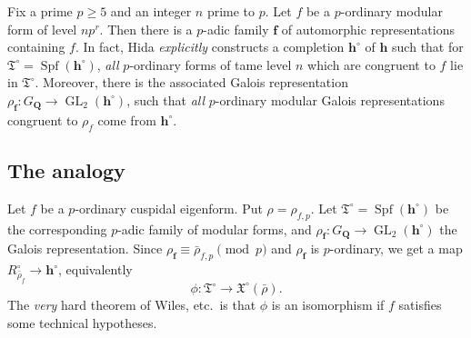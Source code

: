 \documentclass[oneside]{amsart}
\DeclareMathOperator{\formalspectrum}{Spf}
\DeclareMathOperator{\GL}{GL}
\newcommand{\dQ}{\mathbf{Q}}
\newcommand{\fT}{\mathfrak{T}}
\newcommand{\fX}{\mathfrak{X}}
\newcommand{\hida}{\mathbf{h}}
\begin{document}
Fix a prime $p\geqslant 5$ and an integer $n$ prime to $p$. Let $f$ be a 
$p$-ordinary modular form of level $n p^r$. Then there is a $p$-adic 
family $\bm f$ of automorphic representations containing $f$. In fact, Hida 
\emph{explicitly} constructs a completion $\hida^\circ$ of $\hida$ such that 
for $\fT^\circ=\formalspectrum(\hida^\circ)$, \emph{all} $p$-ordinary forms 
of tame level $n$ which are congruent to $f$ lie in $\fT^\circ$. Moreover, 
there is the associated Galois representation 
$\rho_{\bm f}:G_\dQ\to \GL_2(\hida^\circ)$, such that \emph{all} $p$-ordinary 
modular Galois representations congruent to $\rho_f$ come from 
$\hida^\circ$. 





\subsection{The analogy}

Let $f$ be a $p$-ordinary cuspidal eigenform. Put $\rho=\rho_{f,p}$. Let 
$\fT^\circ=\formalspectrum(\hida^\circ)$ be the corresponding $p$-adic family 
of modular forms, and $\rho_{\bm f}:G_\dQ\to \GL_2(\hida^\circ)$ the Galois 
representation. Since $\rho_{\bm f}\equiv \bar\rho_{f,p} \pmod p$ and 
$\rho_{\bm f}$ is $p$-ordinary, we get a map 
$R_{\bar\rho_f}^\circ \to \hida^\circ$, equivalently 
\[
  \phi:\fT^\circ \to \fX^\circ(\bar\rho) .
\]
The \emph{very} hard theorem of Wiles, etc.~is that $\phi$ is an isomorphism if 
$f$ satisfies some technical hypotheses. 







\end{document}
